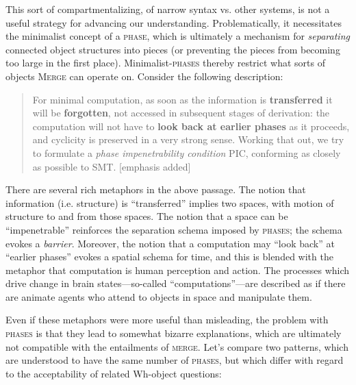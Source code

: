   This sort of compartmentalizing, of narrow syntax vs. other systems, is not a useful strategy for advancing our understanding. Problematically, it necessitates the minimalist concept of a \textsc{phase}, which is ultimately a mechanism for \textit{separating} connected object structures into pieces (or preventing the pieces from becoming too large in the first place). Minimalist-\textsc{phases} thereby restrict what sorts of objects \textsc{Merge} can operate on. Consider the following description:

\begin{quote}
For minimal computation, as soon as the information is \textbf{transferred} it will be \textbf{forgotten}, not accessed in subsequent stages of derivation: the computation will not have to \textbf{look back at earlier phases} as it proceeds, and cyclicity is preserved in a very strong sense. Working that out, we try to formulate a \textit{phase \textit{impenetrability} condition} PIC, conforming as closely as possible to SMT. \citep{Chomsky2008} [emphasis added]
\end{quote}

  There are several rich metaphors in the above passage. The notion that information (i.e. structure) is “transferred” implies two spaces, with motion of structure to and from those spaces. The notion that a space can be “impenetrable” reinforces the separation schema imposed by \textsc{phases}; the schema evokes a \textit{barrier}. Moreover, the notion that a computation may “look back” at “earlier phases” evokes a spatial schema for time, and this is blended with the metaphor that computation is human perception and action. The processes which drive change in brain states—so-called “computations”—are described as if there are animate agents who attend to objects in space and manipulate them.

  Even if these metaphors were more useful than misleading, the problem with \textsc{phases} is that they lead to somewhat bizarre explanations, which are ultimately not compatible with the entailments of \textsc{merge}. Let's compare two patterns, which are understood to have the same number of \textsc{phases}, but which differ with regard to the acceptability of related Wh-object questions:

\ea\label{ex:5:x1}
\z
\z

\ea\label{ex:5:x2}
\z
\z

